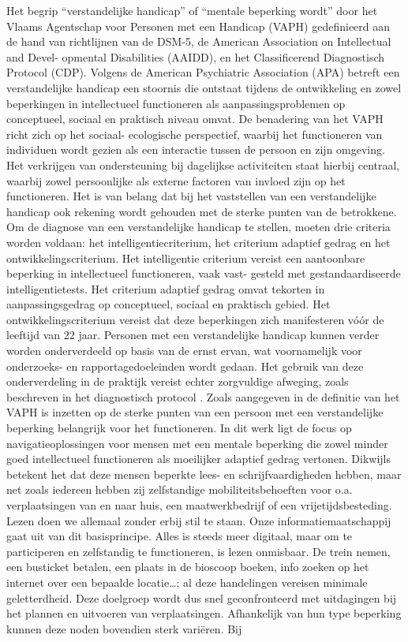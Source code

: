 Het begrip ``verstandelijke handicap'' of ``mentale beperking wordt'' door het Vlaams Agentschap voor Personen met een Handicap (VAPH) gedefinieerd aan de hand van richtlijnen van de DSM-5, de American Association on Intellectual and Devel- opmental Disabilities (AAIDD), en het Classificerend Diagnostisch Protocol (CDP). Volgens de American Psychiatric Association (APA) betreft een verstandelijke handicap een stoornis die ontstaat tijdens de ontwikkeling en zowel beperkingen in intellectueel functioneren als aanpassingsproblemen op conceptueel, sociaal en praktisch niveau omvat. De benadering van het VAPH richt zich op het sociaal- ecologische perspectief, waarbij het functioneren van individuen wordt gezien als een interactie tussen de persoon en zijn omgeving. Het verkrijgen van ondersteuning bij dagelijkse activiteiten staat hierbij centraal, waarbij zowel persoonlijke als externe factoren van invloed zijn op het functioneren. Het is van belang dat bij het vaststellen van een verstandelijke handicap ook rekening wordt gehouden met de sterke punten van de betrokkene. Om de diagnose van een verstandelijke handicap te stellen, moeten drie criteria worden voldaan: het intelligentiecriterium, het criterium adaptief gedrag en het ontwikkelingscriterium. Het intelligentie criterium vereist een aantoonbare beperking in intellectueel functioneren, vaak vast- gesteld met gestandaardiseerde intelligentietests. Het criterium adaptief gedrag omvat tekorten in aanpassingsgedrag op conceptueel, sociaal en praktisch gebied. Het ontwikkelingscriterium vereist dat deze beperkingen zich manifesteren vóór de leeftijd van 22 jaar. Personen met een verstandelijke handicap kunnen verder worden onderverdeeld op basis van de ernst ervan, wat voornamelijk voor on\-der\-zoeks- en rapportagedoeleinden wordt gedaan. Het gebruik van deze onderverdeling in de praktijk vereist echter zorgvuldige afweging, zoals beschreven in het diagnostisch protocol \autocite{VAPH}. Zoals aangegeven in de definitie van het VAPH is inzetten op de sterke punten van een persoon met een verstandelijke beperking belangrijk voor het functioneren. In dit werk ligt de focus op navigatieoplossingen voor mensen met een mentale beperking die zowel minder goed intellectueel functioneren als moeilijker adaptief gedrag vertonen. Dikwijls betekent het dat deze mensen beperkte lees- en schrijfvaardigheden hebben, maar net zoals iedereen hebben zij zelfstandige mobiliteitsbehoeften voor o.a. verplaatsingen van en naar huis, een maatwerkbedrijf of een vrijetijdsbesteding. Lezen doen we allemaal zonder erbij stil te staan. Onze informatiemaatschappij gaat uit van dit basisprincipe. Alles is steeds meer digitaal, maar om te participeren en zelfstandig te functioneren, is lezen onmisbaar. De trein nemen, een busticket betalen, een plaats in de bioscoop boeken, info zoeken op het internet over een bepaalde locatie\ldots; al deze handelingen vereisen minimale geletterdheid. Deze doelgroep wordt dus snel geconfronteerd met uitdagingen bij het plannen en uitvoeren van verplaatsingen. Afhankelijk van hun type beperking kunnen deze noden bovendien sterk variëren. Bij 
